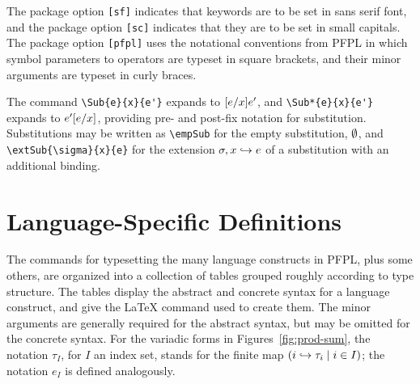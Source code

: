 \documentclass[11pt]{article}
\begin{document}
The package option \verb|[sf]| indicates that keywords are to be set in sans serif font, and the package option \verb|[sc]| indicates that they are to be set in small capitals.  The package option \verb|[pfpl]| uses the notational conventions from \textsf{PFPL} in which symbol parameters to operators are typeset in square brackets, and their minor arguments are typeset in curly braces.

\smallskip

The command \verb|\Sub{e}{x}{e'}| expands to $\Sub{e}{x}{e'}$, and \verb|\Sub*{e}{x}{e'}| expands to $\Sub*{e}{x}{e'}$, providing pre- and post-fix notation for substitution.  Substitutions may be written as \verb|\empSub| for the empty substitution, $\empSub$, and \verb|\extSub{\sigma}{x}{e}| for the extension $\extSub{\sigma}{x}{e}$ of a substitution with an additional binding.

\section*{Language-Specific Definitions}

The commands for typesetting the many language constructs in \textsf{PFPL}, plus some others, are organized into a collection of tables grouped roughly according to type structure.  The tables display the abstract and concrete syntax for a language construct, and give the \LaTeX{} command used to create them.  The minor arguments are generally required for the abstract syntax, but may be omitted for the concrete syntax.  For the variadic forms in Figures~\ref{fig:prod-sum}, the notation $\tau_I$, for $I$ an index set, stands for the finite map $(\finMap{I}{i}{\tau})$; the notation $e_I$ is defined analogously.

\clearpage
{}
\end{document}
